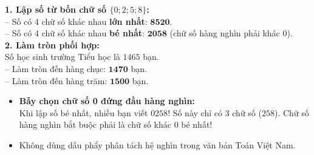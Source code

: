 \documentclass[11pt,a4paper]{article}
\begin{document}
\vspace{-2.5mm}
\noindent
\begin{minipage}[t]{0.49\textwidth}\vspace{0pt}
\begin{tcolorbox}[
  enhanced,
  colback=green!4!white,
  colframe=green!60!black,
  arc=2mm, boxrule=0.8pt,
  left=2mm, right=2mm, top=1.8mm, bottom=1.8mm,
  title={\footnotesize\bfseries\color{white}\faCheckCircle\ Ví dụ thực hành chuẩn mực}
]
{\footnotesize
\textbf{1. Lập số từ bốn chữ số $\{0; 2; 5; 8\}$:}\\
-- Số có 4 chữ số khác nhau \textbf{lớn nhất}: $\mathbf{8520}$.\\
-- Số có 4 chữ số khác nhau \textbf{bé nhất}: $\mathbf{2058}$ (chữ số hàng nghìn phải khác $0$).\\
\textbf{2. Làm tròn phối hợp:}\\
Số học sinh trường Tiểu học là $1465$ bạn.\\
-- Làm tròn đến hàng chục: $\mathbf{1470}$ bạn.\\
-- Làm tròn đến hàng trăm: $\mathbf{1500}$ bạn.
}
\end{tcolorbox}
\end{minipage}
\hfill
\begin{minipage}[t]{0.49\textwidth}\vspace{0pt}
\begin{tcolorbox}[
  enhanced,
  colback=red!4!white,
  colframe=red!70!black,
  arc=2mm, boxrule=0.8pt,
  left=2mm, right=2mm, top=1.8mm, bottom=1.8mm,
  title={\footnotesize\bfseries\color{white}\faExclamationTriangle\ Mẹo tránh bẫy trắc nghiệm}
]
{\footnotesize
\begin{itemize}\setlength{\itemsep}{1.5pt}\setlength{\leftskip}{-2.5mm}
  \item \textbf{Bẫy chọn chữ số 0 đứng đầu hàng nghìn:}\\
  Khi lập số bé nhất, nhiều bạn viết $0258$! Số này chỉ có $3$ chữ số ($258$). Chữ số hàng nghìn bắt buộc phải là chữ số khác $0$ bé nhất!
  \item Không dùng dấu phẩy phân tách hệ nghìn trong văn bản Toán Việt Nam.
\end{itemize}
}
\end{tcolorbox}
\end{minipage}
\end{document}
